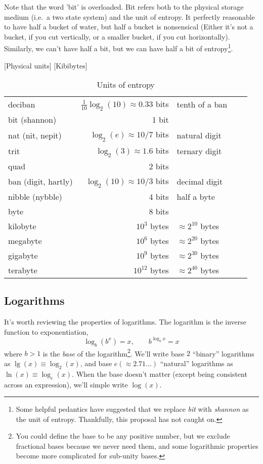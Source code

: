 \documentclass[Lectures.tex]{subfiles}
\begin{document}
Note that the word 'bit' is overloaded. Bit refers both to the physical storage medium (i.e.~a two state system) and the unit of entropy.  It perfectly reasonable to have half a bucket of water, but half a bucket is nonsensical (Either it's not a bucket, if you cut vertically, or a smaller bucket, if you cut horizontally). Similarly, we can't have half a bit, but we can have half a bit of entropy\footnote{Some helpful pedantics have  suggested that  we replace {\sl bit} with {\sl shannon} as the unit of entropy. Thankfully, this proposal has not caught on.}. 

[Physical units]
[Kibibytes]

\begin{table}
\centering
\caption{Units of entropy}
\begin{tabular}{lrlll}
\\
deciban &$\tfrac{1}{10}\log_2(10) \approx 0.33$ bits  & tenth of a ban \\
bit (shannon)    & 1 bit\phantom{s} & ~ &  \\
nat  (nit, nepit)  &  $\log_2(e) \approx 10/7$ bits & natural digit \\
trit & $\log_2(3)\approx 1.6$ bits & ternary digit &\\
quad & 2 bits & & \\
ban (digit, hartly) & $\log_2(10) \approx 10/3$ bits & decimal digit\\
nibble (nybble) & 4 bits & half a byte \\
byte & 8 bits &  & \\
kilobyte & $10^3$  bytes &  $\approx 2^{10}$ bytes& \\
megabyte & $10^6$ bytes & $\approx 2^{20}$ bytes & \\
gigabyte & $10^9$ bytes & $\approx 2^{30}$ bytes & \\
terabyte & $10^{12} $ bytes & $\approx 2^{40} $ bytes & \\
\end{tabular}
\end{table}


\subsection{Logarithms}
It's worth reviewing the properties of logarithms. The logarithm is the inverse function to exponentiation,
\[
\log_b(b^x) = x, \qquad b^{\log_b x} = x
\]
where $b>1$ is the {\sl base} of the logarithm\footnote{You could define the base to be any positive number, but we exclude fractional bases because  we never need them, and some logarithmic properties become more complicated for sub-unity bases.}. We'll write base $2$ ``binary'' logarithms as $\lg(x)\equiv\log_2(x)$, and base $e (\approx 2.71...)$ ``natural'' logarithms as $\ln(x)\equiv\log_e(x)$. When the base doesn't matter (except being consistent across an expression), we'll simple write  $\log(x)$.
\end{document}
